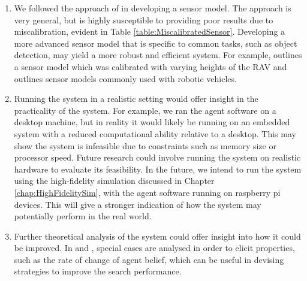 \begin{enumerate}
    \item  We followed the approach of \cite{Chung2007ASearch} in developing a sensor model. The approach is very general, but is highly susceptible to providing poor results due to miscalibration, evident in Table \ref{table:MiscalibratedSensor}. Developing a more advanced sensor model that is specific to common tasks, such as object detection, may yield a more robust and efficient system. For example, \cite{Symington2010ProbabilisticUAVs} outlines a sensor model which was calibrated with varying heights of the RAV and \cite{Thrun:2005:ProbabilisticRobotics} outlines sensor models commonly used with robotic vehicles.
    \item Running the system in a realistic setting would offer insight in the practicality of the system. For example, we ran the agent software on a desktop machine, but in reality it would likely be running on an embedded system with a reduced computational ability relative to a desktop. This may show the system is infeasible due to constraints such as memory size or processor speed. Future research could involve running the system on realistic hardware to evaluate its feasibility. In the future, we intend to run the system using the high-fidelity simulation discussed in Chapter \ref{chap:HighFidelitySim}, with the agent software running on raspberry pi devices. This will give a stronger indication of how the system may potentially perform in the real world.
    \item Further theoretical analysis of the system could offer insight into how it could be improved. In \cite{Chung2012AnalysisStrategies} and \cite{Chung2009ProbabilisticAgents}, special cases are analysed in order to elicit properties, such as the rate of change of agent belief, which can be useful in devising strategies to improve the search performance.
\end{enumerate}